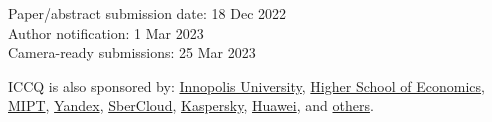 \documentclass{../cfp}
\begin{document}
Paper/abstract submission date: 18 Dec 2022 \\
Author notification: 1 Mar 2023 \\
Camera-ready submissions: 25 Mar 2023

\vspace{6pt}
ICCQ is also sponsored by:
\href{https://innopolis.university/}{Innopolis University},
\href{https://www.hse.ru/en/}{Higher School of Economics},
\href{https://mipt.ru/english/}{MIPT},
\href{https://yandex.com/company/}{Yandex},
\href{https://sbercloud.ru/}{SberCloud},
\href{https://www.kaspersky.com/}{Kaspersky},
\href{https://www.huawei.com/}{Huawei},
and \href{https://www.iccq.ru/2022.html#partners}{others}.
\end{document}
